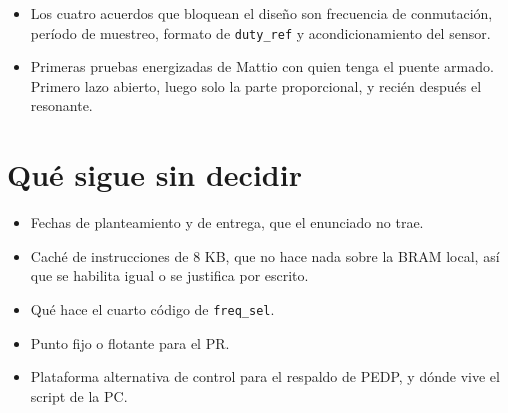 \documentclass[11pt,a4paper]{article}
\begin{document}
\begin{itemize}
\item Los cuatro acuerdos que bloquean el diseño son frecuencia de conmutación, período de muestreo, formato de \texttt{duty\_ref} y acondicionamiento del sensor.
\item Primeras pruebas energizadas de Mattio con quien tenga el puente armado. Primero lazo abierto, luego solo la parte proporcional, y recién después el resonante.
\end{itemize}

\section{Qué sigue sin decidir}

\begin{itemize}
\item Fechas de planteamiento y de entrega, que el enunciado no trae.
\item Caché de instrucciones de 8 KB, que no hace nada sobre la BRAM local, así que se habilita igual o se justifica por escrito.
\item Qué hace el cuarto código de \texttt{freq\_sel}.
\item Punto fijo o flotante para el PR.
\item Plataforma alternativa de control para el respaldo de PEDP, y dónde vive el script de la PC.
\end{itemize}
\end{document}
